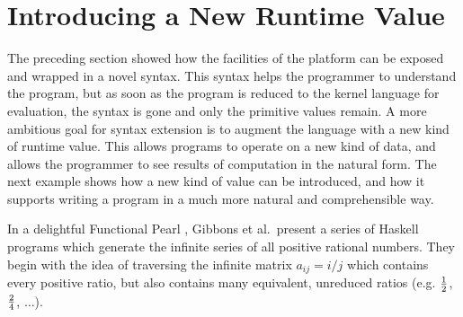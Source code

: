 \section{Introducing a New Runtime Value}
The preceding section showed how the facilities of the platform can be exposed and wrapped in a novel syntax. This syntax helps the programmer to understand the program, but as soon as the program is reduced to the kernel language for evaluation, the syntax is gone and only the primitive values remain. A more ambitious goal for syntax extension is to augment the language with a new kind of runtime value. This allows programs to operate on a new kind of data, and allows the programmer to see results of computation in the natural form. The next example shows how a new kind of value can be introduced, and how it supports writing a program in a much more natural and comprehensible way.

In a delightful Functional Pearl \cite{gibbons}, Gibbons et al.\ present a series of Haskell programs which generate the infinite series of all positive rational numbers. They begin with the idea of traversing the infinite matrix $a_{ij} = i/j$ which contains every positive ratio, but also contains many equivalent, unreduced ratios (e.g. $\nicefrac{1}{2}$, $\nicefrac{2}{4}$, $\dots$).

